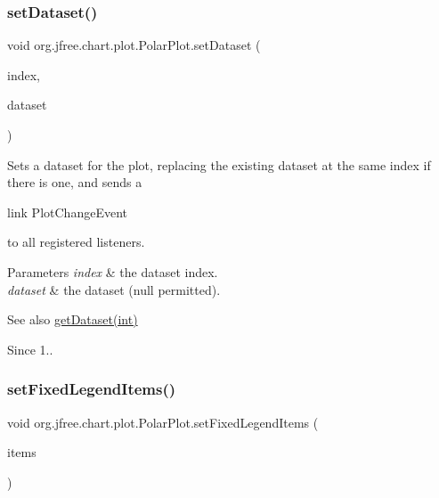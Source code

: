 \subsubsection{\texorpdfstring{set\+Dataset()}{setDataset()}\hspace{0.1cm}{\footnotesize\ttfamily [2/2]}}
{\footnotesize\ttfamily void org.\+jfree.\+chart.\+plot.\+Polar\+Plot.\+set\+Dataset (\begin{DoxyParamCaption}\item[{int}]{index,  }\item[{\mbox{\hyperlink{interfaceorg_1_1jfree_1_1data_1_1xy_1_1_x_y_dataset}{X\+Y\+Dataset}}}]{dataset }\end{DoxyParamCaption})}

Sets a dataset for the plot, replacing the existing dataset at the same index if there is one, and sends a
\begin{DoxyCode}
link PlotChangeEvent 
\end{DoxyCode}
 to all registered listeners.


\begin{DoxyParams}{Parameters}
{\em index} & the dataset index. \\
\hline
{\em dataset} & the dataset ({\ttfamily null} permitted).\\
\hline
\end{DoxyParams}
\begin{DoxySeeAlso}{See also}
\mbox{\hyperlink{classorg_1_1jfree_1_1chart_1_1plot_1_1_polar_plot_af389ea8f23f5fa9343c96faa7f8fddbb}{get\+Dataset(int)}}
\end{DoxySeeAlso}
\begin{DoxySince}{Since}
1.. 
\end{DoxySince}
\mbox{\label{classorg_1_1jfree_1_1chart_1_1plot_1_1_polar_plot_a6ed8b0a9982bf4d0cacd52fa8f1b57d0}} 
\subsubsection{\texorpdfstring{set\+Fixed\+Legend\+Items()}{setFixedLegendItems()}}
{\footnotesize\ttfamily void org.\+jfree.\+chart.\+plot.\+Polar\+Plot.\+set\+Fixed\+Legend\+Items (\begin{DoxyParamCaption}\item[{\mbox{\hyperlink{classorg_1_1jfree_1_1chart_1_1_legend_item_collection}{Legend\+Item\+Collection}}}]{items }\end{DoxyParamCaption})}

